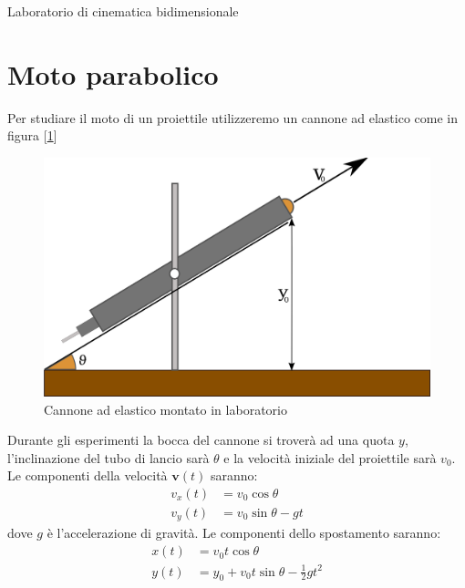 \documentclass[a4paper,10pt,oneside]{article}
\begin{document}
\begin{center}
{\huge Laboratorio di cinematica bidimensionale}
\end{center}

\begin{abstract}
In questo laboratorio studieremo il moto parabolico ed il moto circolare  tramite l'osservazione della traiettoria di un corpo (quasi) puntiforme.
\end{abstract}


\vspace{1.5cm}


\section{Moto parabolico}

Per studiare il moto di un proiettile utilizzeremo un cannone ad elastico come in figura [\ref{fig:cannone1}]
\begin{figure}[H]
 \centering
 \includegraphics[width=\textwidth]{./Immagini/cannone.png}
 \caption{Cannone ad elastico montato in laboratorio}
 \label{fig:cannone1}
\end{figure}
Durante gli esperimenti la bocca del cannone si troverà ad una quota $y$, l'inclinazione del tubo di lancio sarà $\theta$ e la velocità iniziale del proiettile sarà $v_0$. Le componenti della velocità $\mathbf{v}(t)$ saranno:
\begin{align}
 v_x(t)&=v_0\cos \theta\\
 v_y(t)&=v_0\sin\theta -gt
\end{align}
dove $g$ è l'accelerazione di gravità. Le componenti dello spostamento saranno:
\begin{align}\label{posizione}
 x(t)&=v_0t\cos\theta\\
 y(t)&=y_0+v_0t\sin \theta -\frac{1}{2} g t^2
\end{align}
\end{document}
